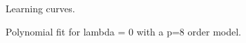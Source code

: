 \documentclass{article}
\begin{document}
\begin{figure}[h]
  \caption{Learning curves.}\label{fig:8}
\end{figure}

\begin{figure}[h]
  \caption{Polynomial fit for lambda = 0 with a p=8 order model.}\label{fig:9}
\end{figure}
\end{document}
